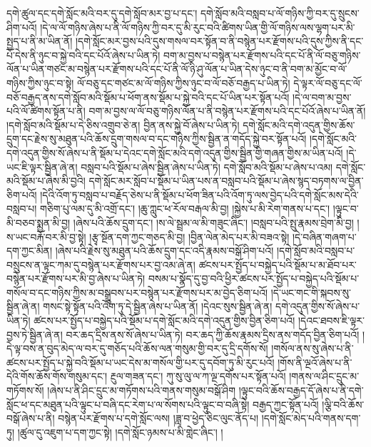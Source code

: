 དགེ་ཚུལ་དང་དགེ་སློང་མའི་བར་དུ་དགེ་སློབ་མར་བྱ་པ་དང་། དགེ་སློབ་མའི་བསླབ་པ་ལོ་གཉིས་ཀྱི་བར་དུ་སྲུངས་ཤིག་པའོ། །དེ་ལ་ལོ་གཉིས་ཞེས་པ་ནི་ལོ་གཉིས་ཀྱི་བར་དུ་མི་རུང་བའི་ཚིགས་ཡིན་གྱི་ལོ་གཉིས་ལས་ལྷག་པར་མི་སྤྱད་པ་ནི་མ་ཡིན་ནོ། །དགེ་སློང་མར་བྱས་པའི་དུས་གསལ་བར་སྟོན་བ་ནི་བསྙེན་པར་རྫོགས་པའི་དུས་ཀྱིས་ནི་དང་པོ་དེས་ནི་ཉུང་བ་སྐྱེ་བའི་དང་པོའོ་ཞེས་པ་ཡིན་ཏེ། བག་མ་བྱས་པ་བསྙེན་པར་རྫོགས་པའི་དང་པོ་ནི་ལོ་བཅུ་གཉིས་ལོན་པ་ཡིན་གཙང་མ་བསྙེན་པར་རྫོགས་པའི་དང་པོ་ནི་ལོ་ཉི་ཤུ་ལོན་པ་ཡིན་དེས་ཉུང་བ་ནི་བག་མ་མྱོང་བ་ལོ་གཉིས་ཀྱིས་ཉུང་བ་སྟེ། ལོ་བཅུ་དང་གཙང་མ་ལོ་གཉིས་ཀྱིས་ཉུང་བ་ལོ་བཅོ་བརྒྱད་པ་ཡིན་ཏེ། དེ་ལྟར་ལོ་བཅུ་དང་ལོ་བཅོ་བརྒྱད་ནས་དགེ་སློབ་མའི་སྡོམ་པ་ཕོག་ནས་སྡོམ་པ་སྐྱེ་བའི་དང་པོ་ཡིན་པར་སྟོན་པའོ། །དེ་ལ་བག་མ་བྱས་པའི་ལོ་ཚིགས་སྟོན་པ་ནི། བག་མ་བྱས་ལ་ལོ་བཅུ་གཉིས་ལོན་པ་ནི་བསྙེན་པར་རྫོགས་པའི་དང་པོའོ་ཞེས་པ་ཡིན་ནོ། །དགེ་སློབ་མའི་སྡོམ་པ་དེ་ཅིས་འགྲུབ་ཅེ་ན། བྱིན་ནས་སྐྱེ་བོ་ཞེས་པ་ཡིན་ཏེ། དགེ་སློང་མའི་དགེ་འདུན་གྱིས་ཆོས་དྲུག་དང་རྗེས་སུ་མཐུན་པའི་ཆོས་དྲུག་གསལ་བ་དང་གཉིས་ཀྱིས་སྦྱིན་ན་གདོད་སྐྱེ་བར་སྟོན་པའོ། །དགེ་སློང་མའི་དགེ་འདུན་གྱིས་སོ་ཞེས་པ་ནི་སྡོམ་པ་དེའང་དགེ་སློང་མའི་དགེ་འདུན་གྱིས་སྦྱིན་གྱི་གཞན་གྱིས་མ་ཡིན་པའོ། །དེ་ཡང་ཇི་ལྟར་སྦྱིན་ཞེ་ན། བསླབ་པའི་སྡོམ་པ་ཞེས་སྦྱིན་ཞེས་པ་ཡིན་ཏེ། དགེ་སློབ་མའི་སྡོམ་པ་ཞེས་པ་འམ། དགེ་སློང་མའི་སྡོམ་པ་ཞེས་མི་བྱའི། དགེ་སློང་མར་སློབ་པ་སྡོམ་པ་ཡིན་པས་ན་བསླབ་པའི་སྡོམ་པ་ཞེས་སྙད་བཏགས་ལ་བྱིན་ཅིག་པའོ། །དེའི་འོག་ཏུ་བསླབ་པ་བརྗོད་ཅེས་པ་ནི་སྡོམ་པ་ཕོག་ཟིན་པའི་འོག་ཏུ་ལས་བྱེད་པའི་དགེ་སློང་མས་དེའི་བསླབ་པ། གཅིག་པུ་ལམ་དུ་མི་འགྲོ་དང་། །ཆུ་ཀླུང་ཕ་རོལ་བརྒལ་མི་བྱ། །སྐྱེས་པ་མི་རེག་གནས་པ་དང་། །ལྟུང་བ་མི་བཅབ་སྨྱན་མི་བྱ། །ཞེས་པའི་ཆོས་དྲུག་དང་། །ས་ལེ་སྦྲམ་ལ་མི་གཟུང་ཞིང་། །བསླབ་པའི་སྤུ་རྣམས་བྲེག་མི་བྱ། །ས་ཡང་བརྐོ་བར་མི་བྱ་སྟེ། །རྩྭ་སྔོན་དག་ཀྱང་གཅད་མི་བྱ། །བྱིན་ལེན་མེད་པར་མི་བཟའ་སྟེ། །དེ་བཞིན་གཞག་པ་དག་ཀྱང་མིན། །ཞེས་པའི་རྗེས་སུ་མཐུན་པའི་ཆོས་དྲུག་དང་འདི་རྣམས་བསྒོ་ཤིག་པའོ། །དགེ་སློབ་མའི་བསླབ་པ་བསྲུངས་ན་ལྟང་ཀམ་དུ་བསྙེན་པར་རྫོགས་པར་བྱ་འམ་ཞེ་ན། ཚངས་པར་སྤྱོད་པ་བསྐྱེད་པའི་སྡོམ་པ་མ་ཐོབ་པར་བསྙེན་པར་རྫོགས་པར་མི་བྱ་ཞེས་པ་ཡིན་ཏེ། བསམ་པ་སྣོད་དུ་བྱ་བའི་ཕྱིར་ཚངས་པར་སྤྱོད་པ་བསྐྱེད་པའི་སྡོམ་པ་གསོལ་བ་དང་གཉིས་ཀྱིས་མ་བསྒྲུབས་པར་བསྙེན་པར་རྫོགས་པར་མ་བྱེད་ཅིག་པའོ། །དེ་ཡང་གང་གི་སྐབས་སུ་སྦྱིན་ཞེ་ན། གསང་སྟེ་སྟོན་པའི་འོག་ཏུ་དེ་སྦྱིན་ཞེས་པ་ཡིན་ནོ། །དེའང་སུས་སྦྱིན་ཞེ་ན། དགེ་འདུན་གྱིས་སོ་ཞེས་པ་ཡིན་ཏེ། ཚངས་པར་སྤྱོད་པ་བསྐྱེད་པའི་སྡོམ་པ་དགེ་སློང་མའི་དགེ་འདུན་གྱིས་བྱིན་ཅིག་པའོ། །དེའང་ཐབས་ཇི་ལྟར་བྱས་ཏེ་སྦྱིན་ཞེ་ན། བར་ཆད་དྲིས་ནས་སོ་ཞེས་པ་ཡིན་ཏེ། བར་ཆད་ཀྱི་ཆོས་རྣམས་དྲིས་ནས་གདོད་བྱིན་ཅིག་པའོ། །དེ་ལྟ་བས་ན་བུད་མེད་ལ་བར་དུ་གཅོད་པའི་ཆོས་ལན་གསུམ་གྱི་བར་དུ་དྲི་དགོས་སོ། །གསོལ་ནས་སུ་ཞེས་པ་ནི་ཚངས་པར་སྤྱོད་པ་སྐྱེ་བའི་སྡོམ་པ་ཡང་དེས་མ་གསོལ་གྱི་པར་དུ་དབོག་ཏུ་མི་རུང་པའོ། །གོས་ནི་ལྔའོ་ཞེས་པ་ནི་དེའི་གོས་ཆོས་གོས་གསུམ་དང་། རྔུལ་གཟན་དང་། ཀུ་སུ་ལུ་ལ་ཀ་ལྔ་དགོས་པར་སྟོན་པའོ། །གནས་ལ་ཤིང་དྲུང་མ་གཏོགས་སོ། །ཞེས་པ་ནི་ཤིང་དྲུང་མ་གཏོགས་པའི་གནས་གསུམ་བསྒོ་ཤིག །ལྟུང་བའི་ཆོས་བརྒྱད་དོ་ཞེས་པ་ནི་དགེ་སློང་ཕ་དང་མཐུན་པའི་ལྟུང་པ་བཞི་དང་རེག་པ་ལ་སོགས་པའི་ལྟུང་བ་བཞི་སྟེ། བརྒྱད་ཀྱང་སྟོན་པའོ། །ལྕི་བའི་ཆོས་བསྒོ་ཞེས་པ་ནི། བསྙེན་པར་རྫོགས་པ་དགེ་སློང་ལས། །ཟླ་བ་ཕྱེད་ཅིང་ལུང་ནོད་པ། །དགེ་སློང་མེད་པའི་གནས་དག་ཏུ། །ཚུལ་དུ་འཇུག་པ་དག་ཀྱང་སྟེ། །དགེ་སློང་ཉམས་པ་མི་གླེང་ཞིང་། །
